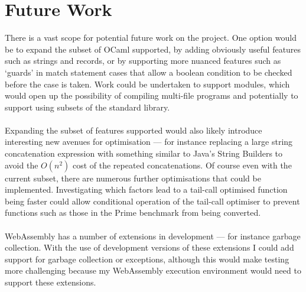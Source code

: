\section{Future Work}
There is a vast scope for potential future work on the project. One option would be to expand the subset of OCaml supported, by adding obviously useful features such as strings and records, or by supporting more nuanced features such as `guards' in match statement cases that allow a boolean condition to be checked before the case is taken. Work could be undertaken to support modules, which would open up the possibility of compiling multi-file programs and potentially to support using subsets of the standard library.
\\\\
Expanding the subset of features supported would also likely introduce interesting new avenues for optimisation --- for instance replacing a large string concatenation expression with something similar to Java's String Builders to avoid the $O(n^2)$ cost of the repeated concatenations. Of course even with the current subset, there are numerous further optimisations that could be implemented. Investigating which factors lead to a tail-call optimised function being faster could allow conditional operation of the tail-call optimiser to prevent functions such as those in the Prime benchmark from being converted.
\\\\
WebAssembly has a number of extensions in development --- for instance garbage collection. With the use of development versions of these extensions I could add support for garbage collection or exceptions, although this would make testing more challenging because my WebAssembly execution environment would need to support these extensions.
